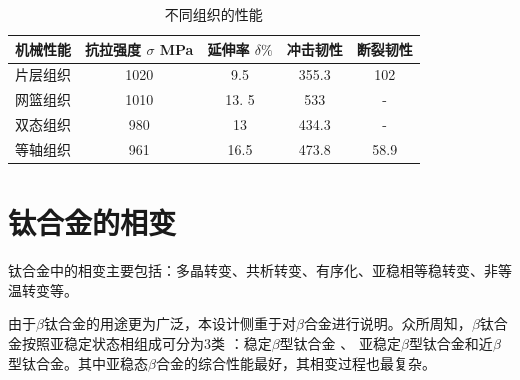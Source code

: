 \begin{table}[htbp]
	\centering
	\label{sec:detial}
	\caption{不同组织的性能}
	\begin{tabular}{ccccc}
		\toprule
		机械性能 & 抗拉强度 $ \sigma$ MPa & 延伸率 $\delta\%$ & 冲击韧性& 断裂韧性 \\  \midrule
		片层组织 & 1020 & 9.5 & 355.3 & 102 \\
		网篮组织 & 1010 & 13. 5 & 533 & - \\
		双态组织 & 980 & 13 & 434.3 & - \\
		等轴组织 & 961 & 16.5 & 473.8 & 58.9 \\ \bottomrule
	\end{tabular}
\end{table}
\section{钛合金的相变}
钛合金中的相变主要包括：多晶转变、共析转变、有序化、亚稳相等稳转变、非等温转变等。


由于$\beta$钛合金的用途更为广泛，本设计侧重于对$\beta$合金进行说明。众所周知，$\beta$钛合金按照亚稳定状态相组成可分为3类 ：稳定$\beta$型钛合金 、 亚稳定$\beta$型钛合金和近$\beta$型钛合金。其中亚稳态$\beta$合金的综合性能最好，其相变过程也最复杂。


